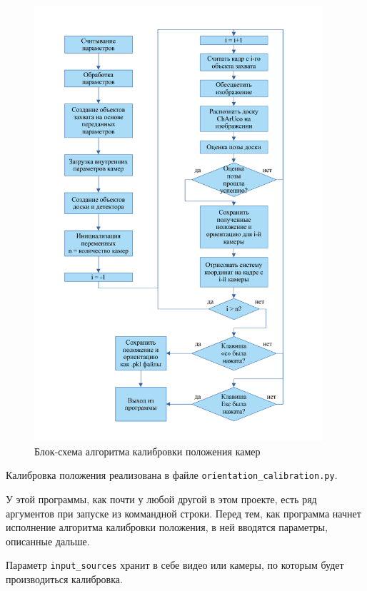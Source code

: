 \documentclass[12pt, a4paper]{article}
\begin{document}
\begin{figure}[h!]
  \begin{center}
    \includegraphics[width=0.95\textwidth]{images/block-schemes/orientation_scheme.png}
  \end{center}
  \caption{Блок-схема алгоритма калибровки положения камер}\label{fig:orientation_calibration_scheme}
\end{figure}

Калибровка положения реализована в файле \texttt{orientation\_calibration.py}.

У этой программы, как почти у любой другой в этом проекте, есть ряд аргументов
при запуске из коммандной строки. Перед тем, как программа начнет исполнение
алгоритма калибровки положения, в ней вводятся параметры, описанные дальше.

Параметр \texttt{input\_sources} хранит в себе видео или камеры, по которым
будет производиться калибровка.
\end{document}
